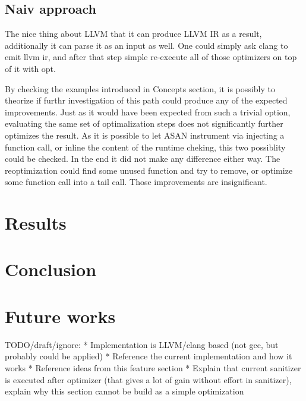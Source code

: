 \documentclass[letterpaper, 10 pt]{llncs}
\let\cite\parencite
\begin{document}
\subsection{Naiv approach}

The nice thing about LLVM that it can produce LLVM IR as a result, additionally it can parse it as an input as well. One could simply ask clang to emit llvm ir, and after that step simple re-execute all of those optimizers on top of it with opt.

By checking the examples introduced in Concepts section, it is possibly to theorize if furthr investigation of this path could produce any of the expected improvements. Just as it would have been expected from such a trivial option, evaluating the same set of optimalization steps does not significantly further optimizes the result. As it is possible to let ASAN instrument via injecting a function call, or inline the content of the runtime cheking, this two possiblity could be checked. In the end it did not make any difference either way. The reoptimization could find some unused function and try to remove, or optimize some function call into a tail call. Those improvements are insignificant.

\section{Results}
\section{Conclusion}
\section{Future works}



TODO/draft/ignore:
* Implementation is LLVM/clang based (not gcc, but probably could be applied)
* Reference the current implementation \cite{serebryany2012addresssanitizer} and how it works
* Reference \cite{serebryany2012addresssanitizer} ideas from this feature section
* Explain that current sanitizer is executed after optimizer (that gives a lot of gain without effort in sanitizer), explain why this section cannot be build as a simple optimization




\addtolength{\textheight}{-12cm}   %
\end{document}
